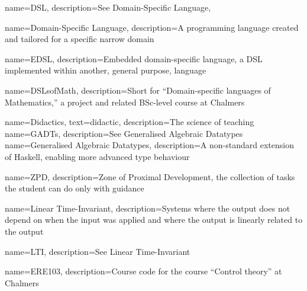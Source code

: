 



{
        name=DSL,
        description={See Domain-Specific Language},
}

{
        name={Domain-Specific Language},
        description={A programming language created and tailored for a specific narrow domain}
}

{
        name=EDSL,
        description={Embedded domain-specific language, a DSL implemented within another, general purpose, language}
}


{
        name=DSLsofMath, 
        description={Short for ``Domain-specific languages of Mathematics,'' a project and related BSc-level course at Chalmers}
}

{
        name=Didactics,
        text=didactic,
        description={The science of teaching}
}
{
        name=GADTs, 
        description={See Generalised Algebraic Datatypes}
}
{
        name=Generalised Algebraic Datatypes, 
        description={A non-standard extension of Haskell, enabling more advanced type behaviour}
}

{
        name=ZPD, 
        description={Zone of Proximal Development, 
        the collection of tasks the student can do only with guidance
        }
}

{
        name=Linear Time-Invariant,
        description={Systems where the output does not depend on when the input was applied and where the output is linearly related to the output}
}

{
        name=LTI,
        description={See \gls{Linear Time-Invariant}}
}

{
        name=ERE103,
        description={Course code for the course ``Control theory'' at Chalmers}
}

